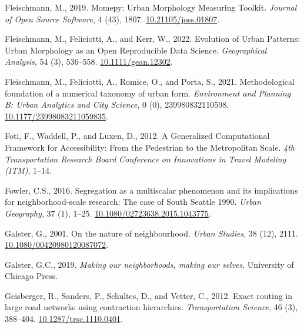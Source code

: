 \documentclass[
  10pt,
]{article}
\newlength{\cslhangindent}
\newenvironment{CSLReferences}[2] %
 {%
  \setlength{\parindent}{0pt}
  \ifodd #1 \everypar{\setlength{\hangindent}{\cslhangindent}}\ignorespaces\fi
  \ifnum #2 > 0
  \setlength{\parskip}{#2\baselineskip}
  \fi
 }%
 {}
\begin{document}
\begin{CSLReferences}{1}{0}
\leavevmode{}%
Fleischmann, M., 2019. Momepy: {Urban Morphology Measuring Toolkit}.
\emph{Journal of Open Source Software}, 4 (43), 1807.
\href{https://doi.org/10.21105/joss.01807}{10.21105/joss.01807}.

\leavevmode{}%
Fleischmann, M., Feliciotti, A., and Kerr, W., 2022. Evolution of {Urban
Patterns}: {Urban Morphology} as an {Open Reproducible Data Science}.
\emph{Geographical Analysis}, 54 (3), 536--558.
\href{https://doi.org/10.1111/gean.12302}{10.1111/gean.12302}.

\leavevmode{}%
Fleischmann, M., Feliciotti, A., Romice, O., and Porta, S., 2021.
Methodological foundation of a numerical taxonomy of urban form.
\emph{Environment and Planning B: Urban Analytics and City Science}, 0
(0), 239980832110598.
\href{https://doi.org/10.1177/23998083211059835}{10.1177/23998083211059835}.

\leavevmode{}%
Foti, F., Waddell, P., and Luxen, D., 2012. A {Generalized Computational
Framework} for {Accessibility}: {From} the {Pedestrian} to the
{Metropolitan Scale}. \emph{4th Transportation Research Board Conference
on Innovations in Travel Modeling (ITM)}, 1--14.

\leavevmode{}%
Fowler, C.S., 2016. Segregation as a multiscalar phenomenon and its
implications for neighborhood-scale research: The case of {South
Seattle} 1990. \emph{Urban Geography}, 37 (1), 1--25.
\href{https://doi.org/10.1080/02723638.2015.1043775}{10.1080/02723638.2015.1043775}.

\leavevmode{}%
Galster, G., 2001. On the nature of neighbourhood. \emph{Urban Studies},
38 (12), 2111.
\href{https://doi.org/10.1080/00420980120087072}{10.1080/00420980120087072}.

\leavevmode{}%
Galster, G.C., 2019. \emph{Making our neighborhoods, making our selves}.
{University of Chicago Press}.

\leavevmode{}%
Geisberger, R., Sanders, P., Schultes, D., and Vetter, C., 2012. Exact
routing in large road networks using contraction hierarchies.
\emph{Transportation Science}, 46 (3), 388--404.
\href{https://doi.org/10.1287/trsc.1110.0401}{10.1287/trsc.1110.0401}.


\end{CSLReferences}
\end{document}
